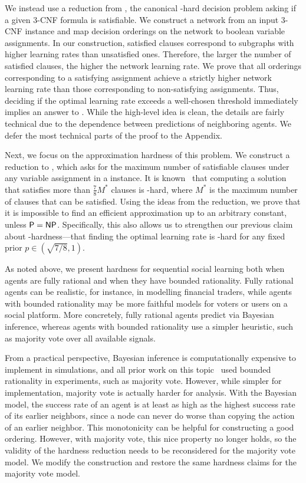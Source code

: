 We instead use a reduction from \sat, the canonical \np-hard decision problem asking if a given 3-CNF formula is satisfiable.
We construct a network from an input 3-CNF instance and map decision orderings on the network to boolean variable assignments.
In our construction, satisfied clauses correspond to subgraphs with higher learning rates than unsatisfied ones.
Therefore, the larger the number of satisfied clauses, the higher the network learning rate.
We prove that all orderings corresponding to a satisfying assignment achieve a strictly higher network learning rate than those corresponding to non-satisfying assignments.
Thus, deciding if the optimal learning rate exceeds a well-chosen threshold immediately implies an answer to \sat{}.
While the high-level idea is clean, the details are fairly technical due to the dependence between predictions of neighboring agents.
We defer the most technical parts of the proof to the Appendix.

Next, we focus on the approximation hardness of this problem.
We construct a reduction to \maxsat{}, which asks for the maximum number of satisfiable clauses under any variable assignment in a \sat{} instance.
It is known~\cite{Hastad2001-fg} that computing a solution that satisfies more than $\frac 78 M^*$ clauses is \np-hard, where $M^*$ is the maximum number of clauses that can be satisfied.
Using the ideas from the \sat{} reduction, we prove that it is impossible to find an efficient approximation up to an arbitrary constant, unless $\textsf{P}=\textsf{NP}$.
Specifically, this also allows us to strengthen our previous claim about \np-hardness---that finding the optimal learning rate is \np-hard for any fixed prior $ p \in (\sqrt{7/8}, 1) $.

As noted above, we present hardness for sequential social learning both when agents are fully rational and when they have bounded rationality. Fully rational agents can be realistic, for instance, in modelling financial traders, while agents with bounded rationality may be more faithful models for voters or users on a social platform. More concretely, fully rational agents predict via Bayesian inference, whereas agents with bounded rationality use a simpler heuristic, such as majority vote over all available signals. 

From a practical perspective, Bayesian inference is computationally expensive to implement in simulations, and all prior work on this topic~\cite{Bahar2020-am,arieli2020social,lu24enabling} used bounded rationality in experiments, such as majority vote. However, while simpler for implementation, majority vote is actually harder for analysis. With the Bayesian model, the success rate of an agent is at least as high as the highest success rate of its earlier neighbors, since a node can never do worse than copying the action of an earlier neighbor. This monotonicity can be helpful for constructing a good ordering. However, with majority vote, this nice property no longer holds, so the validity of the hardness reduction needs to be reconsidered for the majority vote model. We modify the construction and restore the same hardness claims for the majority vote model. 
 
